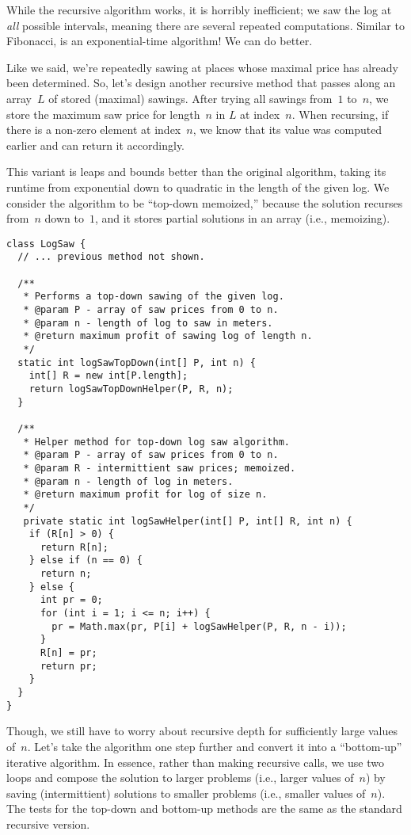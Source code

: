 While the recursive algorithm works, it is horribly inefficient; we saw the log at \emph{all} possible intervals, meaning there are several repeated computations. 
Similar to Fibonacci,  is an exponential-time algorithm! 
We can do better.

Like we said, we're repeatedly sawing at places whose maximal price has already been determined.
So, let's design another recursive method that passes along an array~$L$ of stored (maximal) sawings.
After trying all sawings from~$1$ to~$n$, we store the maximum saw price for length~$n$ in $L$ at index~$n$.
When recursing, if there is a non-zero element at index~$n$, we know that its value was computed earlier and can return it accordingly.

This variant is leaps and bounds better than the original algorithm, taking its runtime from exponential down to quadratic in the length of the given log. 
We consider the algorithm to be ``top-down memoized,'' because the solution recurses from~$n$ down to~$1$, and it stores partial solutions in an array (i.e., memoizing). 

\begin{lstlisting}[language=MyJava]
class LogSaw {
  // ... previous method not shown.

  /**
   * Performs a top-down sawing of the given log.
   * @param P - array of saw prices from 0 to n.
   * @param n - length of log to saw in meters.
   * @return maximum profit of sawing log of length n.
   */
  static int logSawTopDown(int[] P, int n) {
    int[] R = new int[P.length];
    return logSawTopDownHelper(P, R, n);
  }

  /**
   * Helper method for top-down log saw algorithm.
   * @param P - array of saw prices from 0 to n.
   * @param R - intermittient saw prices; memoized.
   * @param n - length of log in meters.
   * @return maximum profit for log of size n.
   */
   private static int logSawHelper(int[] P, int[] R, int n) {
    if (R[n] > 0) {
      return R[n];
    } else if (n == 0) {
      return n;
    } else {
      int pr = 0;
      for (int i = 1; i <= n; i++) {
        pr = Math.max(pr, P[i] + logSawHelper(P, R, n - i));
      }
      R[n] = pr;
      return pr;
    }
  }
}
\end{lstlisting}

Though, we still have to worry about recursive depth for sufficiently large values of~$n$. 
Let's take the algorithm one step further and convert it into a ``bottom-up'' iterative algorithm.
In essence, rather than making recursive calls, we use two loops and compose the solution to larger problems (i.e., larger values of~$n$) by saving (intermittient) solutions to smaller problems (i.e., smaller values of~$n$).
The tests for the top-down and bottom-up methods are the same as the standard recursive version.

